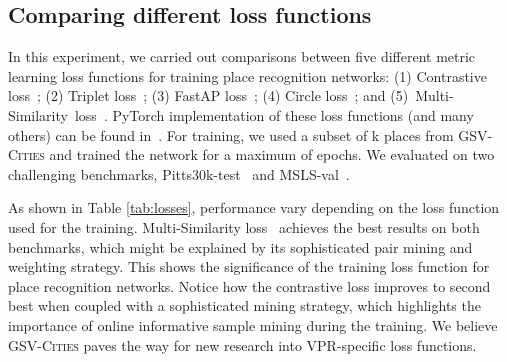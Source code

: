 \documentclass{article}
\begin{document}
\subsection{Comparing different loss functions}
\label{sec:exp:metric_learning}
In this experiment, we carried out comparisons between five different metric learning loss functions for training place recognition networks: (1) Contrastive loss~\cite{hadsell2006dimensionality}; (2) Triplet loss~\cite{hermans2017defense}; (3) FastAP loss~\cite{cakir2019deep}; (4) Circle loss~\cite{sun2020circle}; and \mbox{(5) Multi-Similarity loss~\cite{wang2019multi}}. PyTorch implementation of these loss functions (and many others) can be found in~\cite{musgrave2020pytorch}. 
For training, we used a subset of k places from \textsc{GSV-Cities} and trained the network for a maximum of  epochs. We evaluated on two challenging benchmarks, Pitts30k-test~\cite{torii2013visual} and MSLS-val~\cite{warburg2020mapillary}.

As shown in Table \ref{tab:losses}, performance vary depending on the loss function used for the training. Multi-Similarity loss~\cite{wang2019multi} achieves the best results on both benchmarks, which might be explained by its sophisticated pair mining and weighting strategy. This shows the significance of the training loss function for place recognition networks. Notice how the contrastive loss improves to second best when coupled with a sophisticated mining strategy, which highlights the importance of online informative sample mining during the training. We believe \textsc{GSV-Cities} paves the way for new research into VPR-specific loss functions.
\end{document}
